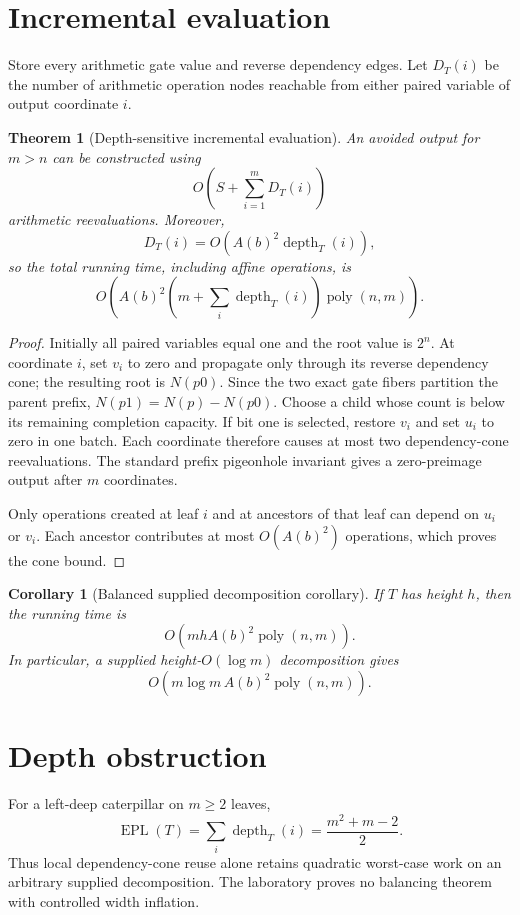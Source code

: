 \documentclass[11pt]{article}
\newtheorem{theorem}{Theorem}
\newtheorem{corollary}{Corollary}
\newcommand{\EPL}{\operatorname{EPL}}
\begin{document}
\section{Incremental evaluation}
Store every arithmetic gate value and reverse dependency edges.  Let $D_T(i)$
be the number of arithmetic operation nodes reachable from either paired
variable of output coordinate $i$.

\begin{theorem}[Depth-sensitive incremental evaluation]
An avoided output for $m>n$ can be constructed using
\[
 O\!\left(S+\sum_{i=1}^m D_T(i)\right)
\]
arithmetic reevaluations.  Moreover,
\[
 D_T(i)=O\!\left(A(b)^2\operatorname{depth}_T(i)\right),
\]
so the total running time, including affine operations, is
\[
 O\!\left(A(b)^2\left(m+\sum_i\operatorname{depth}_T(i)\right)
 \operatorname{poly}(n,m)\right).
\]
\end{theorem}

\begin{proof}
Initially all paired variables equal one and the root value is $2^n$.  At
coordinate $i$, set $v_i$ to zero and propagate only through its reverse
dependency cone; the resulting root is $N(p0)$.  Since the two exact gate
fibers partition the parent prefix, $N(p1)=N(p)-N(p0)$.  Choose a child whose
count is below its remaining completion capacity.  If bit one is selected,
restore $v_i$ and set $u_i$ to zero in one batch.  Each coordinate therefore
causes at most two dependency-cone reevaluations.  The standard prefix
pigeonhole invariant gives a zero-preimage output after $m$ coordinates.

Only operations created at leaf $i$ and at ancestors of that leaf can depend
on $u_i$ or $v_i$.  Each ancestor contributes at most $O(A(b)^2)$ operations,
which proves the cone bound.
\end{proof}

\begin{corollary}[Balanced supplied decomposition corollary]
If $T$ has height $h$, then the running time is
\[
 O(mhA(b)^2\operatorname{poly}(n,m)).
\]
In particular, a supplied height-$O(\log m)$ decomposition gives
\[
 O(m\log m\,A(b)^2\operatorname{poly}(n,m)).
\]
\end{corollary}

\section{Depth obstruction}
For a left-deep caterpillar on $m\ge2$ leaves,
\[
 \EPL(T)=\sum_i\operatorname{depth}_T(i)=\frac{m^2+m-2}{2}.
\]
Thus local dependency-cone reuse alone retains quadratic worst-case work on an
arbitrary supplied decomposition.  The laboratory proves no balancing theorem
with controlled width inflation.
\end{document}
